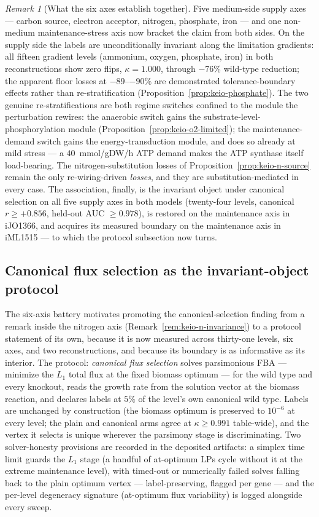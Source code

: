 \documentclass[11pt,a4paper]{article}
\theoremstyle{plain}
\theoremstyle{definition}
\theoremstyle{remark}
\newtheorem{remark}[theorem]{Remark}
\begin{document}
\begin{remark}[What the six axes establish together]
\label{rem:keio-multiaxis}
Five medium-side supply axes --- carbon source, electron acceptor,
nitrogen, phosphate, iron --- and one non-medium maintenance-stress
axis now bracket the claim from both sides. On the supply side the
labels are unconditionally invariant along the limitation gradients:
all fifteen gradient levels (ammonium, oxygen, phosphate, iron) in
both reconstructions show zero flips, $\kappa=1.000$, through
$-76\%$ wild-type reduction; the apparent floor losses at
$-89$--$-90\%$ are demonstrated tolerance-boundary effects rather
than re-stratification
(Proposition~\ref{prop:keio-phosphate}). The two genuine
re-stratifications are both regime switches confined to the module
the perturbation rewires: the anaerobic switch gains the
substrate-level-phosphorylation module
(Proposition~\ref{prop:keio-o2-limited}); the maintenance-demand
switch gains the energy-transduction module, and does so already
at mild stress --- a $40$~mmol/gDW/h ATP demand makes the ATP
synthase itself load-bearing. The nitrogen-substitution losses of
Proposition~\ref{prop:keio-n-source} remain the only
re-wiring-driven \emph{losses}, and they are substitution-mediated
in every case. The association, finally, is the invariant object
under canonical selection on all five supply axes in both models
(twenty-four levels, canonical $r\ge+0.856$, held-out AUC
$\ge0.978$), is restored on the maintenance axis in iJO1366, and
acquires its measured boundary on the maintenance axis in iML1515
--- to which the protocol subsection now turns.
\end{remark}

\subsection{Canonical flux selection as the invariant-object
protocol}\label{sec:canonical-selection}

The six-axis battery motivates promoting the canonical-selection
finding from a remark inside the nitrogen axis
(Remark~\ref{rem:keio-n-invariance}) to a protocol statement of
its own, because it is now measured across thirty-one levels, six
axes, and two reconstructions, and because its boundary is as
informative as its interior. The protocol: \emph{canonical flux
selection} solves parsimonious FBA --- minimize the $L_1$ total
flux at the fixed biomass optimum --- for the wild type and every
knockout, reads the growth rate from the solution vector at the
biomass reaction, and declares labels at $5\%$ of the level's own
canonical wild type. Labels are unchanged by construction (the
biomass optimum is preserved to $10^{-6}$ at every level; the
plain and canonical arms agree at $\kappa\ge0.991$ table-wide),
and the vertex it selects is unique wherever the parsimony stage
is discriminating. Two solver-honesty provisions are recorded in
the deposited artifacts: a simplex time limit guards the $L_1$
stage (a handful of at-optimum LPs cycle without it at the extreme
maintenance level), with timed-out or numerically failed solves
falling back to the plain optimum vertex --- label-preserving,
flagged per gene --- and the per-level degeneracy signature
(at-optimum flux variability) is logged alongside every sweep.
\end{document}
